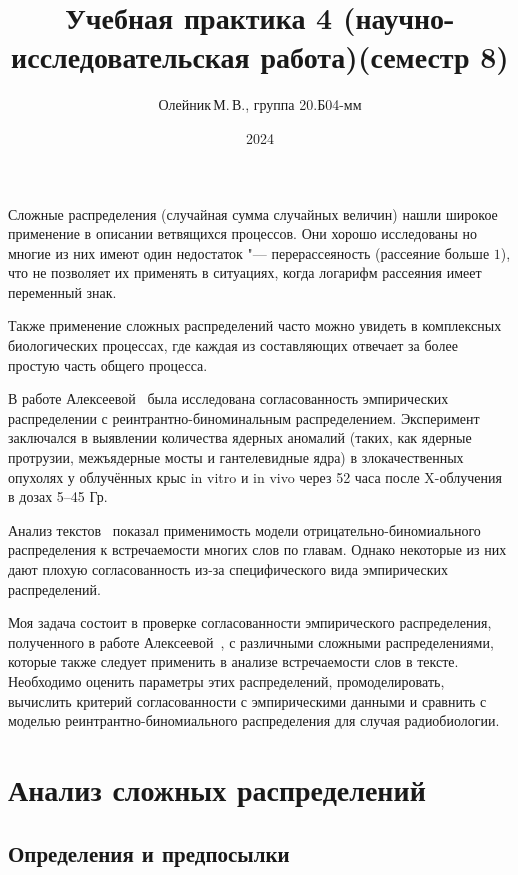 \documentclass[12pt, specialist, subf, substylefile = spbu_report.rtx]{disser}
\title{Учебная практика 4 (научно-исследовательская работа)(семестр 8)}
\author{Олейник\,М.\,В., группа 20.Б04-мм}
\date{2024}
\begin{document}
	\maketitle
	
	\tableofcontents
	
	\intro
	
	Сложные распределения (случайная сумма случайных величин) нашли широкое применение в описании ветвящихся процессов. Они хорошо исследованы но многие из них имеют один недостаток "--- перерассеяность (рассеяние больше $ 1 $), что не позволяет их применять в ситуациях, когда логарифм рассеяния имеет переменный знак.
	
	Также применение сложных распределений часто можно увидеть в комплексных биологических процессах, где каждая из составляющих отвечает за более простую часть общего процесса.
	
	В работе Алексеевой~\cite{bib:alexeeva2008} была исследована согласованность эмпирических распределении с реинтрантно-биноминаль\-ным распределением. Эксперимент заключался в выявлении количества ядерных аномалий (таких, как ядерные протрузии, межъядерные мосты и гантелевидные ядра) в злокачественных опухолях у облучённых крыс in vitro и in vivo через 52 часа после X-облучения в дозах 5--45 Гр.
	
	Анализ текстов~\cite{bib:alexeeva2013} показал применимость модели отрицательно-биномиального распределения к встречаемости многих слов по главам. Однако некоторые из них дают плохую согласованность из-за специфического вида эмпирических распределений. 
	
	Моя задача состоит в проверке согласованности эмпирического распределения, полученного в работе Алексеевой~\cite{bib:alexeeva2008}, с различными сложными распределениями, которые также следует применить в анализе встречаемости слов в тексте. Необходимо оценить параметры этих распределений, промоделировать, вычислить критерий согласованности с эмпирическими данными и сравнить с моделью реинтрантно-биномиального распределения для случая радиобиологии.
	
	\chapter{Анализ сложных распределений}
	
	\section{Определения и предпосылки}
	
\end{document}
